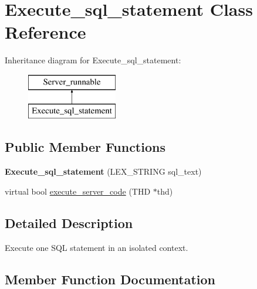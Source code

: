 \hypertarget{classExecute__sql__statement}{}\section{Execute\+\_\+sql\+\_\+statement Class Reference}
\label{classExecute__sql__statement}
Inheritance diagram for Execute\+\_\+sql\+\_\+statement\+:\begin{figure}[H]
\begin{center}
\leavevmode
\includegraphics[height=2.000000cm]{classExecute__sql__statement}
\end{center}
\end{figure}
\subsection*{Public Member Functions}
\begin{DoxyCompactItemize}
\item 
\mbox{\label{classExecute__sql__statement_a9259d781e9cbf50cb053718c92ac6e0f}} 
{\bfseries Execute\+\_\+sql\+\_\+statement} (L\+E\+X\+\_\+\+S\+T\+R\+I\+NG sql\+\_\+text)
\item 
virtual bool \mbox{\hyperlink{classExecute__sql__statement_a026dc9b345e89b1e63b9af783e85d1ed}{execute\+\_\+server\+\_\+code}} (T\+HD $\ast$thd)
\end{DoxyCompactItemize}


\subsection{Detailed Description}
Execute one S\+QL statement in an isolated context. 

\subsection{Member Function Documentation}
\mbox{\label{classExecute__sql__statement_a026dc9b345e89b1e63b9af783e85d1ed}} 
